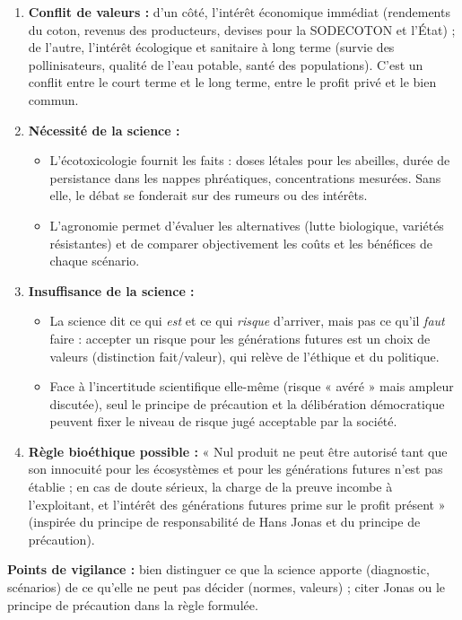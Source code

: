 \documentclass[11pt]{article}
\newcommand{\cle}[1]{{\popxbold\color{popdark}#1}}
\begin{document}
\begin{corrige}
\begin{enumerate}
    \item \textbf{Conflit de valeurs :} d'un côté, l'\cle{intérêt économique} immédiat (rendements du coton, revenus des producteurs, devises pour la SODECOTON et l'État) ; de l'autre, l'\cle{intérêt écologique et sanitaire} à long terme (survie des pollinisateurs, qualité de l'eau potable, santé des populations). C'est un conflit entre le court terme et le long terme, entre le profit privé et le bien commun.
    \item \textbf{Nécessité de la science :}
    \begin{itemize}
        \item L'\cle{écotoxicologie} fournit les faits : doses létales pour les abeilles, durée de persistance dans les nappes phréatiques, concentrations mesurées. Sans elle, le débat se fonderait sur des rumeurs ou des intérêts.
        \item L'\cle{agronomie} permet d'évaluer les alternatives (lutte biologique, variétés résistantes) et de comparer objectivement les coûts et les bénéfices de chaque scénario.
    \end{itemize}
    \item \textbf{Insuffisance de la science :}
    \begin{itemize}
        \item La science dit ce qui \emph{est} et ce qui \emph{risque} d'arriver, mais pas ce qu'il \emph{faut} faire : accepter un risque pour les générations futures est un \cle{choix de valeurs} (distinction fait/valeur), qui relève de l'éthique et du politique.
        \item Face à l'incertitude scientifique elle-même (risque « avéré » mais ampleur discutée), seul le \cle{principe de précaution} et la délibération démocratique peuvent fixer le niveau de risque jugé acceptable par la société.
    \end{itemize}
    \item \textbf{Règle bioéthique possible :} « Nul produit ne peut être autorisé tant que son innocuité pour les écosystèmes et pour les générations futures n'est pas établie ; en cas de doute sérieux, la charge de la preuve incombe à l'exploitant, et l'intérêt des générations futures prime sur le profit présent » (inspirée du \cle{principe de responsabilité} de Hans Jonas et du \cle{principe de précaution}).
\end{enumerate}
\textbf{Points de vigilance :} bien distinguer ce que la science apporte (diagnostic, scénarios) de ce qu'elle ne peut pas décider (normes, valeurs) ; citer Jonas ou le principe de précaution dans la règle formulée.
\end{corrige}
\end{document}
